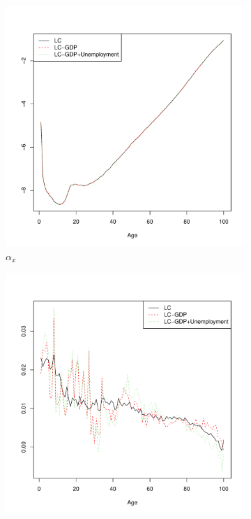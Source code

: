 \documentclass[AER, draftmode]{AEA}
\begin{document}
\begin{figure}[!htp]
	\begin{subfigure}{0.4\textwidth}
		\includegraphics[width=\linewidth]{CAN_ax_female}
		\caption{$\alpha_x$}
		\label{fig:femalea}
	\end{subfigure}
	\begin{subfigure}{0.4\textwidth}
		\includegraphics[width=\linewidth]{CAN_bx_female}

\end{subfigure}
\end{figure}
\end{document}
